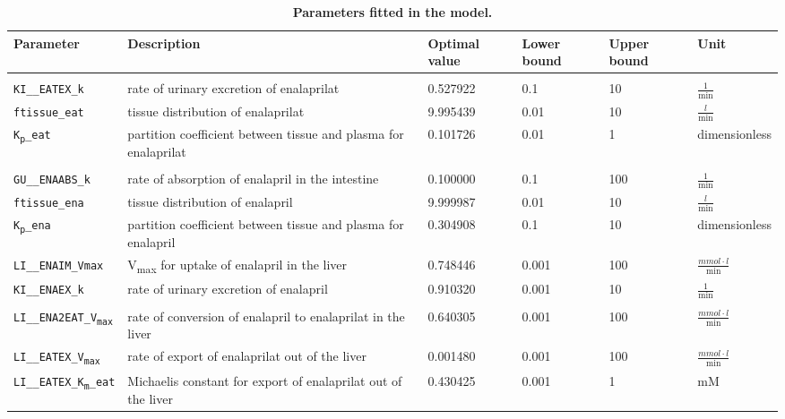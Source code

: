 \documentclass[pharmaceutics,article,submit,pdftex,moreauthors]{Definitions/mdpi}
\begin{document}
\begin{table}[htbp]
\centering
\small
\caption[Fitted model parameters]{\textbf{Parameters fitted in the model.}}\label{tab:Parameter_Fitting}
\begin{tabular}{L{0.17\textwidth} L{0.257\textwidth} P{0.100\textwidth} P{0.075\textwidth} P{0.075\textwidth} P{0.140\textwidth}}
 \toprule
\textbf{Parameter} & \textbf{Description} & \textbf{Optimal value} & \textbf{Lower bound} & \textbf{Upper bound}& \textbf{Unit}\\
\midrule
{}
\\
\midrule
\texttt{KI\_\_EATEX\_k} & rate of urinary excretion of enalaprilat & 0.527922 & 0.1 & 10 & $\frac{1}{\text{min}}$ \\
\texttt{ftissue\_eat} & tissue distribution of enalaprilat & 9.995439 & 0.01 & 10  & $\frac{l}{\text{min}}$ \\
\texttt{K\textsubscript{p}\_eat} & partition coefficient between tissue and plasma for enalaprilat & 0.101726 & 0.01 & 1  & dimensionless \\
\midrule
{}
\\
\midrule
\texttt{GU\_\_ENAABS\_k} & rate of absorption of enalapril in the intestine & 0.100000 & 0.1 & 100 & $\frac{1}{\text{min}}$ \\
\texttt{ftissue\_ena} & tissue distribution of enalapril & 9.999987 & 0.01 & 10 & $\frac{l}{\text{min}}$ \\
\texttt{K\textsubscript{p}\_ena} & partition coefficient between tissue and plasma for enalapril & 0.304908 & 0.1 & 10 & dimensionless \\
\texttt{LI\_\_ENAIM\_Vmax} & V\textsubscript{max} for uptake of enalapril in the liver & 0.748446 & 0.001 & 100 & $\frac{mmol\cdot l}{\text{min}}$ \\
\texttt{KI\_\_ENAEX\_k} & rate of urinary excretion of enalapril & 0.910320 & 0.001 & 10 & $\frac{1}{\text{min}}$ \\
\midrule
{}
\\
\midrule
\texttt{LI\_\_ENA2EAT\_V\textsubscript{max}} & rate of conversion of enalapril to enalaprilat in the liver & 0.640305 & 0.001 & 100 & $\frac{mmol\cdot l}{\text{min}}$ \\
\texttt{LI\_\_EATEX\_V\textsubscript{max}} & rate of export of enalaprilat out of the liver & 0.001480 & 0.001 & 100 & $\frac{mmol\cdot l}{\text{min}}$ \\
\texttt{LI\_\_EATEX\_K\textsubscript{m}\_eat} & Michaelis constant for export of enalaprilat out of the liver & 0.430425 & 0.001 & 1 & mM \\
 \bottomrule
\end{tabular}
\end{table}
\end{document}
